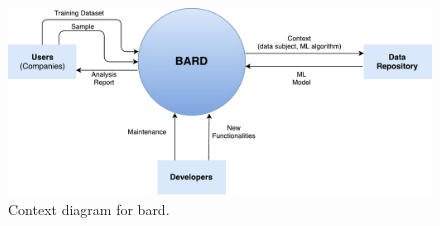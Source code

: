\begin{figure}[ht]
  \centerline{\includegraphics[width=1.1\textwidth]{images/ContextBard.pdf}}
  \caption{Context diagram for \acs{bard}.}
  \label{fig:contextdiag}
\end{figure} 